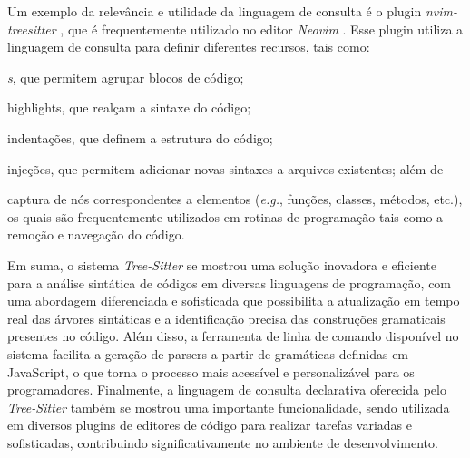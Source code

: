 \documentclass[11pt, openright, twoside, a4paper, english, brazil]{abntex2}
\begin{document}
Um exemplo da relevância e utilidade da linguagem de consulta é o plugin
\textit{nvim-treesitter} \cite{nvim-treesitter-2023-nvim}, que é frequentemente
utilizado no editor \textit{Neovim} \cite{neovim-2014-hyperextensible}. Esse
plugin utiliza a linguagem de consulta para definir diferentes recursos, tais
como:
\begin{inparaenum}
  \item \textit{s}, que permitem agrupar blocos de código;
  \item highlights, que realçam a sintaxe do código;
  \item indentações, que definem a estrutura do código;
  \item injeções, que permitem adicionar novas sintaxes a arquivos existentes;
        além de
  \item captura de nós correspondentes a elementos (\textit{e.g.}, funções,
        classes, métodos, etc.), os quais são frequentemente utilizados em
        rotinas de programação tais como a remoção e navegação do código.
\end{inparaenum}

Em suma, o sistema \textit{Tree-Sitter} se mostrou uma solução inovadora e
eficiente para a análise sintática de códigos em diversas linguagens de
programação, com uma abordagem diferenciada e sofisticada que possibilita a
atualização em tempo real das árvores sintáticas e a identificação precisa das
construções gramaticais presentes no código. Além disso, a ferramenta de linha
de comando disponível no sistema facilita a geração de parsers a partir de
gramáticas definidas em JavaScript, o que torna o processo mais acessível e
personalizável para os programadores. Finalmente, a linguagem de consulta
declarativa oferecida pelo \textit{Tree-Sitter} também se mostrou uma
importante funcionalidade, sendo utilizada em diversos plugins de editores de
código para realizar tarefas variadas e sofisticadas, contribuindo
significativamente no ambiente de desenvolvimento.


\postextual
\printbibliography
{}
\end{document}

